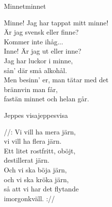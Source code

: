 \newpage

\begin{song}{Minnet}{minnet}
\begin{vers}

Minne! Jag har tappat mitt minne!\\
Är jag svensk eller finne?\\
Kommer inte ihåg...\\
Inne! Är jag ut eller inne?\\
Jag har luckor i minne,\\
sån' där små alkohål.\\
Men besinn' er, man tätar med det\\
brännvin man får,\\
fastän minnet och helan går.\\
\end{vers}
\end{song}

\begin{song}{Jeppes visa}{jeppesvisa}
\begin{vers}
//: Vi vill ha mera järn,\\
vi vill ha flera järn.\\
Ett litet rostfritt, oböjt,\\
destillerat järn.\\
Och vi ska böja järn,\\
och vi ska kröka järn,\\
så att vi har det flytande\\
imorgonkväll. ://\\
\end{vers}
\end{song}

\newpage

